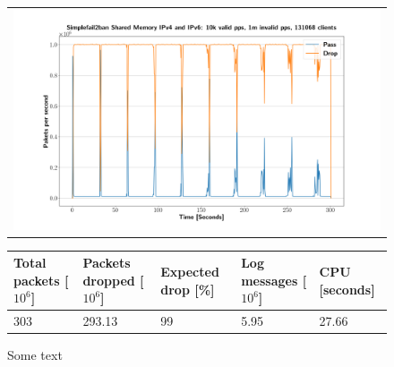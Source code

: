 \begin{figure}[p]
	\label{fig:simplefail2ban:shm:ip46:1m}
	\centering
	\scriptsize
	\begin{tabular}{c}
    	\centerline{\includegraphics[width=1.2\textwidth]{images/simplefail2ban_shm_ipv46_v10k_iv1m_c131068.png}}
	\end{tabular}
	\begin{tabular}{lllll}
		\toprule
		\textbf{Total packets [$10^6$]} & \textbf{Packets dropped [$10^6$]} & \textbf{Expected drop [\%]} & \textbf{Log messages [$10^6$]} & \textbf{CPU [seconds]} \\ \midrule 
		303 & 293.13 & 99 & 5.95 & 27.66 \\
		\bottomrule
	\end{tabular}
	\caption[Simplefail2ban Shared Memory IPv4 \& IPv6 1m PPS]{Some text}
\end{figure}

